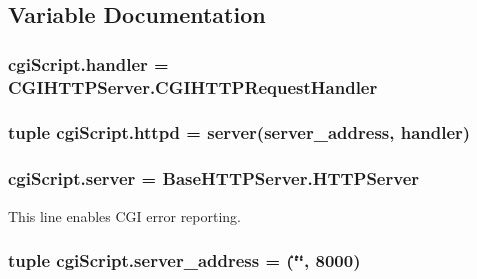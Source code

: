 \subsection{Variable Documentation}
\hypertarget{namespacecgiScript_a7ebc35e3dd0bc24dd580c8e92bbf07ee}{
\subsubsection[{handler}]{\setlength{\rightskip}{0pt plus 5cm}cgi\-Script.\-handler = C\-G\-I\-H\-T\-T\-P\-Server.\-C\-G\-I\-H\-T\-T\-P\-Request\-Handler}}\label{namespacecgiScript_a7ebc35e3dd0bc24dd580c8e92bbf07ee}
\hypertarget{namespacecgiScript_adea267b23595d15b7c3e1b06ab3612f8}{
\subsubsection[{httpd}]{\setlength{\rightskip}{0pt plus 5cm}tuple cgi\-Script.\-httpd = {\bf server}({\bf server\-\_\-address}, {\bf handler})}}\label{namespacecgiScript_adea267b23595d15b7c3e1b06ab3612f8}
\hypertarget{namespacecgiScript_adc901b0e02ec64c67b0a20271d2e7cec}{
\subsubsection[{server}]{\setlength{\rightskip}{0pt plus 5cm}cgi\-Script.\-server = Base\-H\-T\-T\-P\-Server.\-H\-T\-T\-P\-Server}}\label{namespacecgiScript_adc901b0e02ec64c67b0a20271d2e7cec}


This line enables C\-G\-I error reporting. 

\hypertarget{namespacecgiScript_a7a16c4aff12e8496b8c738408a1dcde8}{
\subsubsection[{server\-\_\-address}]{\setlength{\rightskip}{0pt plus 5cm}tuple cgi\-Script.\-server\-\_\-address = (\char`\"{}\char`\"{}, 8000)}}\label{namespacecgiScript_a7a16c4aff12e8496b8c738408a1dcde8}
